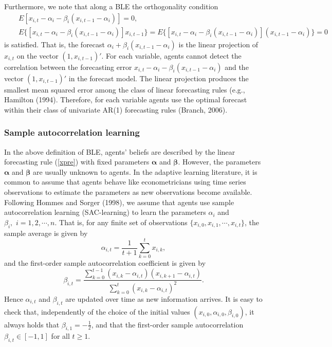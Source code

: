 Furthermore, we note that along a BLE the orthogonality condition
\begin{eqnarray*}
&&E[x_{i,t}-\alpha_i-\beta_{i}(x_{i,t-1}-\alpha_i)]=0,\\
&&E\{[x_{i,t}-\alpha_i-\beta_{i}(x_{i,t-1}-\alpha_i)]x_{i,t-1}\}=E\{[x_{i,t}-\alpha_i-\beta_{i}(x_{i,t-1}-\alpha_i)](x_{i,t-1}-\alpha_i)\}=0
\end{eqnarray*}
is satisfied. That is, the forecast $\alpha_i+\beta_i(x_{i,t-1}-\alpha_i)$ is the linear projection of $x_{i,t}$ on the vector $(1,x_{i,t-1})'$. For each variable, agents cannot detect the correlation between the forecasting error $x_{i,t}-\alpha_i-\beta_{i}(x_{i,t-1}-\alpha_i)$ and the vector $(1,x_{i,t-1})'$ in the forecast model. The linear projection produces the smallest mean squared error among the class of linear forecasting rules (e.g., Hamilton (1994). Therefore, for each variable agents use the optimal forecast within their class of univariate AR(1) forecasting rules (Branch, 2006).

\subsubsection*{Sample autocorrelation learning}
In the above definition of BLE, agents' beliefs are
described by the linear forecasting rule (\ref{xpre}) with fixed
parameters $\pmb\alpha$ and $\pmb\beta$. However, the parameters $\pmb\alpha$ and $\pmb\beta$ are usually unknown to agents. In the adaptive learning
literature, it is common to assume that agents behave like
econometricians using time series observations to estimate the
parameters as new observations become available. Following
Hommes and Sorger (1998), we assume that agents use sample
autocorrelation learning (SAC-learning) to learn the parameters
$\alpha_i$ and $\beta_i, \,\,i=1,2,\cdots,n$. That is, for any finite set of observations
$\{x_{i,0}, x_{i,1},\cdots,x_{i,t}\}$, the sample average is given by
\begin{equation}\label{sacalpha}
\alpha_{i,t}=\frac{1}{t+1}\sum_{k=0}^{t}x_{i,k},
\end{equation}
and the first-order sample autocorrelation coefficient is given by
\begin{equation}\label{sacbeta}
\beta_{i,t}=\frac{\sum_{k=0}^{t-1}(x_{i,k}-\alpha_{i,t})(x_{i,k+1}-\alpha_{i,t})}{\sum_{k=0}^{t}(x_{i,k}-\alpha_{i,t})^2}.
\end{equation}
Hence $\alpha_{i,t}$ and $\beta_{i,t}$ are updated over time as new
information arrives. It is  easy to check that, independently of the
choice of the initial values $(x_{i,0}, \alpha_{i,0}, \beta_{i,0})$, it always
holds that $\beta_{i,1}=-\frac{1}{2}$, and that the first-order sample
autocorrelation $\beta_{i,t}\in[-1,1]$ for all $t\geq 1$.

